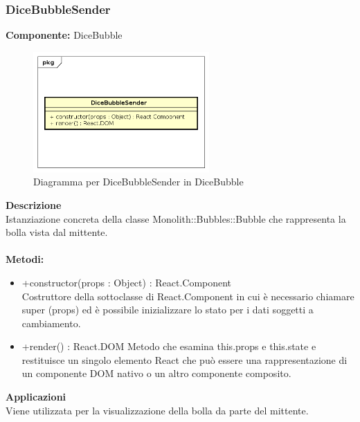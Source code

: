 \subsubsection{DiceBubbleSender}
\textbf{Componente:}  DiceBubble\\
   \FloatBarrier
   \begin{figure}[ht]
   \centering
   \includegraphics[width=0.6\textwidth]{img/single-DiceBubbleSender}
   \caption{{Diagramma per DiceBubbleSender in DiceBubble}}
\end{figure}
\FloatBarrier
\textbf{Descrizione}\\
Istanziazione concreta della classe Monolith::Bubbles::Bubble che rappresenta la bolla vista dal mittente.
\\
\\
\textbf{Metodi:} 
\begin{itemize}
\item +constructor(props : Object) : React.Component 
\\
Costruttore della sottoclasse di React.Component in cui è necessario chiamare super (props) ed è possibile inizializzare lo stato per i dati soggetti a cambiamento.

\item +render() : React.DOM
Metodo che esamina this.props e this.state e restituisce un singolo elemento React che può essere una rappresentazione di un componente DOM nativo o un altro componente composito.

\end{itemize} 


\textbf{Applicazioni}\\
Viene utilizzata per la visualizzazione della bolla da parte del mittente. 


\clearpage

